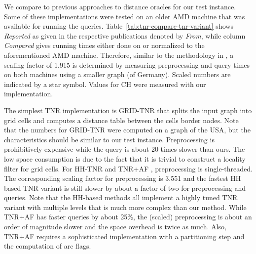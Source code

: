 \documentclass{llncs}
\begin{document}
We compare to previous approaches to distance oracles for our test instance.
Some of these implementations were tested on an older AMD machine \cite{s-rprn-08} that was available for running the queries.
Table~\ref{tab:tnr-compare-tnr-variant} shows \textit{Reported} as given in the respective publications denoted by \emph{From}, while column \textit{Compared} gives running times either done on or normalized to the aforementioned AMD machine.
Therefore, similar to the methodology in \cite{bdsssw-chgds-10}, a scaling factor of 1.915 is determined by measuring preprocessing and query times on both machines using a smaller graph (of Germany).
Scaled numbers are indicated by a star symbol.
Values for CH were measured with our implementation.

The simplest TNR implementation is GRID-TNR that splits the input graph into grid cells and computes a distance table between the cells border nodes.
Note that the numbers for GRID-TNR were computed on a graph of the USA, but the characteristics should be similar to our test instance.
Preprocessing is prohibitively expensive while the query is about 20 times slower than ours.
The low space consumption is due to the fact that it is trivial to construct a locality filter for grid cells.
For HH-TNR \cite{s-rprn-08} and TNR+AF \cite{bdsssw-chgds-10}, preprocessing is single-threaded. 
The corresponding scaling factor for preprocessing is 3.551 and the fastest HH based TNR variant is still slower by about a factor of two for preprocessing and queries.
Note that the HH-based methods all implement a highly tuned TNR variant with multiple levels that is much more complex than our method.
While TNR+AF has faster queries by about 25\%, the (scaled) preprocessing is about an order of magnitude slower and the space overhead is twice as much.
Also, TNR+AF requires a sophisticated implementation with a partitioning step and the computation of arc flags.
\end{document}
